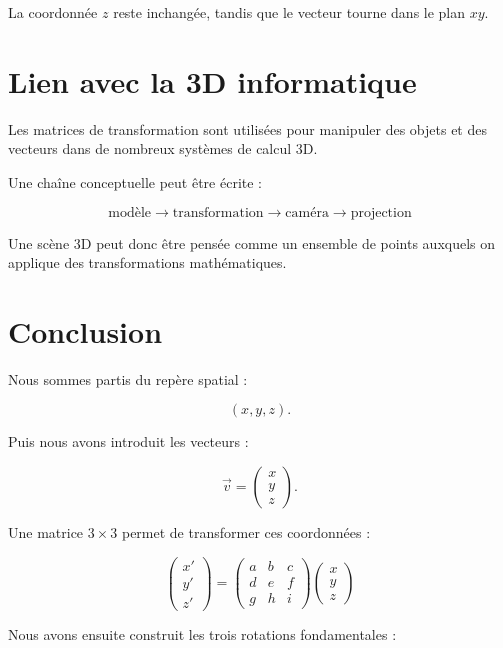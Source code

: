\documentclass[11pt,a4paper]{article}
\newcommand{\sectiontitle}[1]{\section{#1}}
\begin{document}
La coordonnée $z$ reste inchangée, tandis que le vecteur tourne
dans le plan $xy$.


\sectiontitle{Lien avec la 3D informatique}

Les matrices de transformation sont utilisées pour manipuler des
objets et des vecteurs dans de nombreux systèmes de calcul 3D.

Une chaîne conceptuelle peut être écrite :

\[
\boxed{
\text{modèle}
\rightarrow
\text{transformation}
\rightarrow
\text{caméra}
\rightarrow
\text{projection}
}
\]

Une scène 3D peut donc être pensée comme un ensemble de points
auxquels on applique des transformations mathématiques.


\sectiontitle{Conclusion}

Nous sommes partis du repère spatial :

\[
(x,y,z).
\]

Puis nous avons introduit les vecteurs :

\[
\vec v=
\begin{pmatrix}
 x\\
 y\\
 z
\end{pmatrix}.
\]

Une matrice $3\times3$ permet de transformer ces coordonnées :

\[
\boxed{
\begin{pmatrix}
x'\\
y'\\
z'
\end{pmatrix}
=
\begin{pmatrix}
a&b&c\\
d&e&f\\
g&h&i
\end{pmatrix}
\begin{pmatrix}
x\\y\\z
\end{pmatrix}
}
\]

Nous avons ensuite construit les trois rotations fondamentales :
\end{document}
